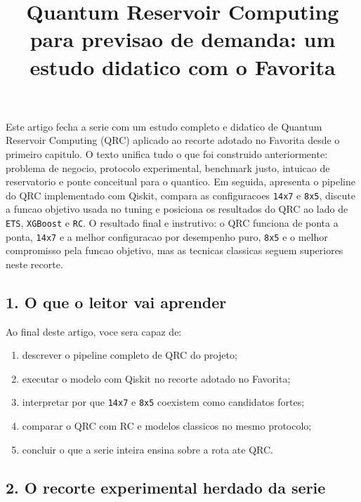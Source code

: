\documentclass[12pt]{article}
\title{Quantum Reservoir Computing para previsao de demanda: um estudo didatico com o Favorita}
\author{}
\providecommand{\tightlist}{%
          \setlength{\itemsep}{0pt}\setlength{\parskip}{0pt}}
\begin{document}
        \maketitle

        \begin{resumo}
        Este artigo fecha a serie com um estudo completo e didatico de Quantum Reservoir Computing (QRC) aplicado ao recorte adotado no Favorita desde o primeiro capitulo. O texto unifica tudo o que foi construido anteriormente: problema de negocio, protocolo experimental, benchmark justo, intuicao de reservatorio e ponte conceitual para o quantico. Em seguida, apresenta o pipeline do QRC implementado com Qiskit, compara as configuracoes \texttt{14x7} e \texttt{8x5}, discute a funcao objetivo usada no tuning e posiciona os resultados do QRC ao lado de \texttt{ETS}, \texttt{XGBoost} e \texttt{RC}. O resultado final e instrutivo: o QRC funciona de ponta a ponta, \texttt{14x7} e a melhor configuracao por desempenho puro, \texttt{8x5} e o melhor compromisso pela funcao objetivo, mas as tecnicas classicas seguem superiores neste recorte.
        \end{resumo}

        \subsection{1. O que o leitor vai aprender}\label{1-o-que-o-leitor-vai-aprender}

Ao final deste artigo, voce sera capaz de:

\begin{enumerate}
\def\labelenumi{\arabic{enumi}.}
\tightlist
\item
  descrever o pipeline completo de QRC do projeto;
\item
  executar o modelo com Qiskit no recorte adotado no Favorita;
\item
  interpretar por que \texttt{14x7} e \texttt{8x5} coexistem como candidatos fortes;
\item
  comparar o QRC com RC e modelos classicos no mesmo protocolo;
\item
  concluir o que a serie inteira ensina sobre a rota ate QRC.
\end{enumerate}

\subsection{2. O recorte experimental herdado da serie}\label{2-o-recorte-experimental-herdado-da-serie}
\end{document}

